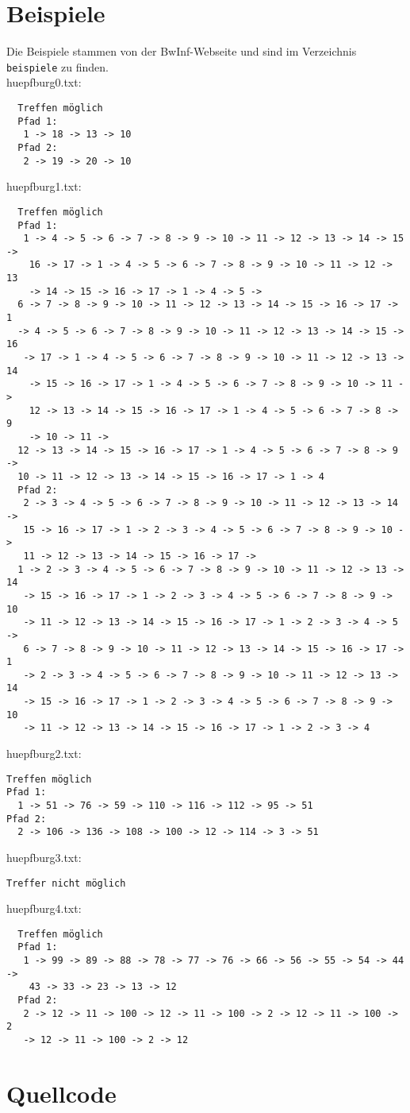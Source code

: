 \documentclass[a4paper,10pt,ngerman]{scrartcl}
\begin{document}
\section{Beispiele}
Die Beispiele stammen von der BwInf-Webseite und sind im Verzeichnis \lstinline|beispiele| zu finden.\\
huepfburg0.txt: \\
\begin{lstlisting}
  Treffen möglich
  Pfad 1:
   1 -> 18 -> 13 -> 10
  Pfad 2:
   2 -> 19 -> 20 -> 10
\end{lstlisting}
huepfburg1.txt: \\
\begin{lstlisting}
  Treffen möglich
  Pfad 1:
   1 -> 4 -> 5 -> 6 -> 7 -> 8 -> 9 -> 10 -> 11 -> 12 -> 13 -> 14 -> 15 ->
    16 -> 17 -> 1 -> 4 -> 5 -> 6 -> 7 -> 8 -> 9 -> 10 -> 11 -> 12 -> 13 
    -> 14 -> 15 -> 16 -> 17 -> 1 -> 4 -> 5 -> 
  6 -> 7 -> 8 -> 9 -> 10 -> 11 -> 12 -> 13 -> 14 -> 15 -> 16 -> 17 -> 1 
  -> 4 -> 5 -> 6 -> 7 -> 8 -> 9 -> 10 -> 11 -> 12 -> 13 -> 14 -> 15 -> 16
   -> 17 -> 1 -> 4 -> 5 -> 6 -> 7 -> 8 -> 9 -> 10 -> 11 -> 12 -> 13 -> 14
    -> 15 -> 16 -> 17 -> 1 -> 4 -> 5 -> 6 -> 7 -> 8 -> 9 -> 10 -> 11 -> 
    12 -> 13 -> 14 -> 15 -> 16 -> 17 -> 1 -> 4 -> 5 -> 6 -> 7 -> 8 -> 9 
    -> 10 -> 11 -> 
  12 -> 13 -> 14 -> 15 -> 16 -> 17 -> 1 -> 4 -> 5 -> 6 -> 7 -> 8 -> 9 -> 
  10 -> 11 -> 12 -> 13 -> 14 -> 15 -> 16 -> 17 -> 1 -> 4
  Pfad 2:
   2 -> 3 -> 4 -> 5 -> 6 -> 7 -> 8 -> 9 -> 10 -> 11 -> 12 -> 13 -> 14 -> 
   15 -> 16 -> 17 -> 1 -> 2 -> 3 -> 4 -> 5 -> 6 -> 7 -> 8 -> 9 -> 10 -> 
   11 -> 12 -> 13 -> 14 -> 15 -> 16 -> 17 -> 
  1 -> 2 -> 3 -> 4 -> 5 -> 6 -> 7 -> 8 -> 9 -> 10 -> 11 -> 12 -> 13 -> 14
   -> 15 -> 16 -> 17 -> 1 -> 2 -> 3 -> 4 -> 5 -> 6 -> 7 -> 8 -> 9 -> 10 
   -> 11 -> 12 -> 13 -> 14 -> 15 -> 16 -> 17 -> 1 -> 2 -> 3 -> 4 -> 5 -> 
   6 -> 7 -> 8 -> 9 -> 10 -> 11 -> 12 -> 13 -> 14 -> 15 -> 16 -> 17 -> 1 
   -> 2 -> 3 -> 4 -> 5 -> 6 -> 7 -> 8 -> 9 -> 10 -> 11 -> 12 -> 13 -> 14 
   -> 15 -> 16 -> 17 -> 1 -> 2 -> 3 -> 4 -> 5 -> 6 -> 7 -> 8 -> 9 -> 10 
   -> 11 -> 12 -> 13 -> 14 -> 15 -> 16 -> 17 -> 1 -> 2 -> 3 -> 4
\end{lstlisting}
huepfburg2.txt: \\
\begin{lstlisting}
Treffen möglich
Pfad 1:
  1 -> 51 -> 76 -> 59 -> 110 -> 116 -> 112 -> 95 -> 51
Pfad 2:
  2 -> 106 -> 136 -> 108 -> 100 -> 12 -> 114 -> 3 -> 51
\end{lstlisting}
huepfburg3.txt: \\
\begin{lstlisting}
Treffer nicht möglich
\end{lstlisting}
huepfburg4.txt: \\
\begin{lstlisting}
  Treffen möglich
  Pfad 1:
   1 -> 99 -> 89 -> 88 -> 78 -> 77 -> 76 -> 66 -> 56 -> 55 -> 54 -> 44 ->
    43 -> 33 -> 23 -> 13 -> 12
  Pfad 2:
   2 -> 12 -> 11 -> 100 -> 12 -> 11 -> 100 -> 2 -> 12 -> 11 -> 100 -> 2 
   -> 12 -> 11 -> 100 -> 2 -> 12
\end{lstlisting}	
\section{Quellcode}

\end{document}
